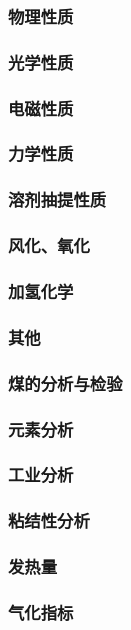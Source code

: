 \documentclass[UTF8]{../../ApplicationUniverse}
\begin{document}
    \subsubsection{物理性质}
    \subsubsection{光学性质}
    \subsubsection{电磁性质}
    \subsubsection{力学性质}
    \subsubsection{溶剂抽提性质}
    \subsubsection{风化、氧化}
    \subsubsection{加氢化学}
    \subsubsection{其他}
\subsubsection{煤的分析与检验}
    \subsubsection{元素分析}
    \subsubsection{工业分析}
    \subsubsection{粘结性分析}
    \subsubsection{发热量}
    \subsubsection{气化指标}
\end{document}
